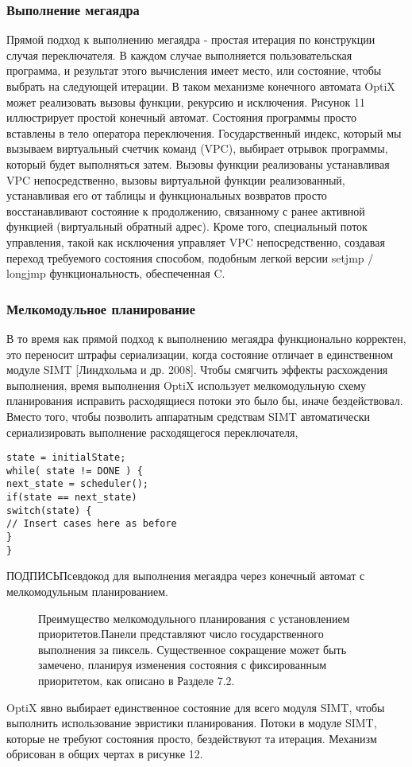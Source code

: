 \subsubsection{ Выполнение мегаядра}
Прямой подход к выполнению мегаядра - простая итерация по конструкции случая переключателя. В каждом случае выполняется пользовательская программа, и результат этого вычисления имеет место, или состояние, чтобы выбрать на следующей итерации. В таком механизме конечного автомата OptiX может реализовать вызовы функции, рекурсию и исключения.
Рисунок 11 иллюстрирует простой конечный автомат. Состояния программы просто вставлены в тело оператора переключения. Государственный индекс, который мы вызываем виртуальный счетчик команд (VPC), выбирает отрывок программы, который будет выполняться затем. Вызовы функции реализованы устанавливая VPC непосредственно, вызовы виртуальной функции реализованный, устанавливая его от таблицы и функциональных возвратов просто восстанавливают состояние к продолжению, связанному с ранее активной функцией (виртуальный обратный адрес). Кроме того, специальный поток управления, такой как исключения управляет VPC непосредственно, создавая переход требуемого состояния способом, подобным легкой версии setjmp / longjmp функциональность, обеспеченная C.
\subsubsection{ Мелкомодульное планирование}
В то время как прямой подход к выполнению мегаядра функционально корректен, это переносит штрафы сериализации, когда состояние отличает в единственном модуле SIMT [Линдхольма и др. 2008]. Чтобы смягчить эффекты расхождения выполнения, время выполнения OptiX использует мелкомодульную схему планирования исправить расходящиеся потоки
это было бы, иначе бездействовал. Вместо того, чтобы позволить аппаратным средствам SIMT автоматически сериализировать выполнение расходящегося переключателя, 
\begin{verbatim}
state = initialState;
while( state != DONE ) {
next_state = scheduler();
if(state == next_state)
switch(state) {
// Insert cases here as before
}
}
\end{verbatim}
ПОДПИСЬПсевдокод для выполнения мегаядра через конечный автомат с мелкомодульным планированием.
\begin{figure}[h!]
\caption{Преимущество мелкомодульного планирования с установлением приоритетов.Панели представляют число государственного выполнения за пиксель. Существенное сокращение может быть замечено, планируя изменения состояния с фиксированным приоритетом, как описано в Разделе 7.2.}
\label{fig4}
\end{figure}
OptiX явно выбирает единственное состояние для всего модуля SIMT, чтобы выполнить использование эвристики планирования. Потоки в модуле SIMT, которые не требуют состояния просто, бездействуют та итерация. Механизм обрисован в общих чертах в рисунке 12.

